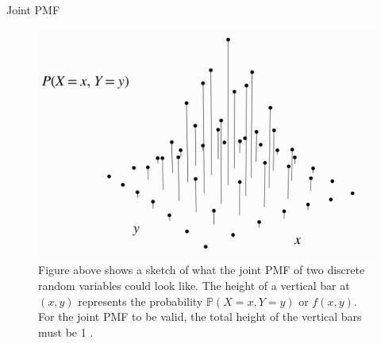 \documentclass[8pt, usepdftitle = false]{beamer}
\begin{document}
\begin{frame}{Joint PMF}
\begin{figure}
  \includegraphics[scale = .25]{Images/joint_PMF.png}
  \caption{Figure above shows a sketch of what the joint PMF of two discrete random variables could look like. The height of a vertical bar at $(x, y)$ represents the probability $\mathbb{P}(X=x, Y=y)$ or $f(x, y)$. For the joint PMF to be valid, the total height of the vertical bars must be 1 .}
\end{figure}




\end{frame}
\end{document}
